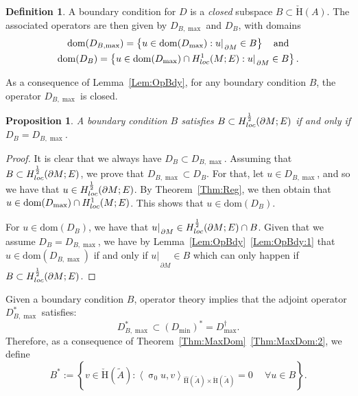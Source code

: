 \documentclass[a4paper,10pt,reqno]{amsart}
\newcommand{\sym}{\upsigma}
\newcommand{\rest}[1]{{{\lvert_{}}_{}}_{#1}}
\newcommand{\dbrac}[1]{\left\{#1\right\}}
\newcommand{\ad}{\ast}
\newcommand{\set}[1]{\dbrac{#1}}
\newcommand{\Hard}[2][{}]{{\rm H}^{#2}_{\rm #1}}%
\newcommand{\SobH}[2][{}]{\Hard[#1]{\rm #2}}
\newcommand{\checkH}{\check{\mathrm{H}}}
\newcommand{\hatH}{\hat{\mathrm{H}}}
\newcommand{\dom}{\mathrm{dom}}
\newcommand{\intersect}{\cap}
\newcommand{\inprod}[1]{\left\langle #1 \right\rangle}%
\newcommand{\dM}{\partial M}
\newtheorem{proposition}[theorem]{Proposition}
\theoremstyle{definition}
\newtheorem{definition}[theorem]{Definition}
\begin{document}
\begin{definition}
A boundary condition for $D$ is a \emph{closed} subspace $B \subset \checkH(A)$.
The associated operators are then given by $D_{B,\max}$ and $D_{B}$, with domains
\begin{gather*}
\dom(D_{B,\max}) = \set{ u \in \dom(D_{\max}): u\rest{\dM} \in B} \quad\text{and}\\
\dom(D_{B}) = \set{ u \in \dom(D_{\max}) \intersect \SobH[loc]{1}(M;E): u \rest\dM \in B} .
\end{gather*}
\end{definition}

As a consequence of Lemma~\ref{Lem:OpBdy}, for any boundary condition $B$, the operator $D_{B,\max}$ is closed.

\begin{proposition}
A boundary condition $B$ satisfies $B \subset \SobH[loc]{\frac{1}{2}}(\dM;E)$ if and only if $D_{B} = D_{B,\max}$.
\end{proposition}
\begin{proof}
It is clear that we always have $D_{B} \subset D_{B,\max}$.
Assuming that $B \subset \SobH[loc]{\frac{1}{2}}(\dM;E)$, we prove that $D_{B,\max} \subset D_{B}$.
For that, let $u \in D_{B,\max}$, and so we have that $u \in \SobH[loc]{\frac{1}{2}}(\dM;E)$.
By Theorem~\ref{Thm:Reg}, we then obtain that $u \in \dom(D_{\max}) \intersect \SobH[loc]{1}(M;E)$.
This shows that $u \in \dom(D_{B})$.

For $u \in \dom(D_B)$, we have that $u\rest{\dM} \in \SobH[loc]{\frac{1}{2}}(\dM;E) \intersect B$.
Given that we assume $D_{B} = D_{B,\max}$, we have by Lemma~\ref{Lem:OpBdy}~\ref{Lem:OpBdy:1} that $u \in \dom(D_{B,\max})$ if and only if  $u\rest{\dM} \in B$ which can only happen if $B \subset \SobH[loc]{\frac{1}{2}}(\dM;E)$.
\end{proof}

Given a boundary condition $B$, operator theory implies that the adjoint operator $D_{B,\max}^\ad$ satisfies:
$$D_{B,\max}^\ad \subset (D_{\min})^\ad = D^\dagger_{\max}.$$
Therefore, as a consequence of Theorem~\ref{Thm:MaxDom}~\ref{Thm:MaxDom:2}, we define
\begin{equation}
\label{Eq:Bad}
B^{\ad} := \set{v \in \checkH(\tilde{A}): \inprod{\sym_0 u, v}_{\hatH(\tilde{A}) \times \checkH(\tilde{A})} = 0\ \quad\forall u \in B}.
\end{equation}
\end{document}
